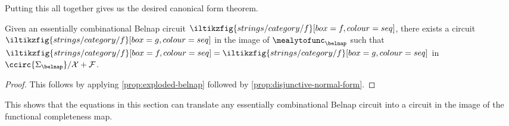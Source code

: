 Putting this all together gives us the desired canonical form theorem.

\begin{theorem}
    Given an essentially combinational Belnap circuit \(
    \iltikzfig{strings/category/f}[box=f,colour=seq]
    \), there exists a circuit \(
    \iltikzfig{strings/category/f}[box=g,colour=seq]
    \) in the image of \(\mealytofunc_\belnap\) such that \(
    \iltikzfig{strings/category/f}[box=f,colour=seq]
    =
    \iltikzfig{strings/category/f}[box=g,colour=seq]
    \) in \(\ccirc{\Sigma_\belnap} / \mathcal{X} + \mathcal{F}\).
\end{theorem}
\begin{proof}
    This follows by applying \cref{prop:exploded-belnap} followed by
    \cref{prop:disjunctive-normal-form}.
\end{proof}

This shows that the equations in this section can translate any
essentially combinational Belnap circuit into a circuit in the image of the
functional completeness map.